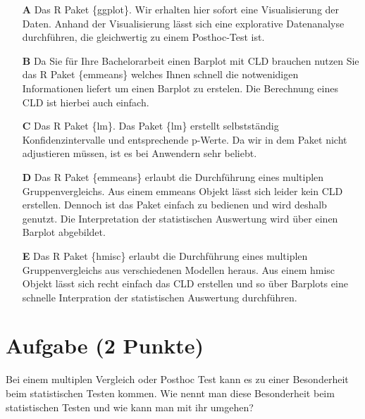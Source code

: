 \documentclass[a4paper, 9pt]{scrartcl}\usepackage[]{graphicx}\usepackage[]{xcolor}
\begin{document}
\begin{enumerate}
\item [\textbf{A} \msquare] Das R Paket \{ggplot\}. Wir erhalten hier sofort eine Visualisierung der Daten. Anhand der Visualisierung lässt sich eine explorative Datenanalyse durchführen, die gleichwertig zu einem Posthoc-Test ist.
\item [\textbf{B} \msquare] Da Sie für Ihre Bachelorarbeit einen Barplot mit CLD brauchen nutzen Sie das R Paket \{emmeans\} welches Ihnen schnell die notwenidigen Informationen liefert um einen Barplot zu erstelen. Die Berechnung eines CLD ist hierbei auch einfach.
\item [\textbf{C} \msquare] Das R Paket \{lm\}. Das Paket \{lm\} erstellt selbstständig Konfidenzintervalle und entsprechende p-Werte. Da wir in dem Paket nicht adjustieren müssen, ist es bei Anwendern sehr beliebt.
\item [\textbf{D} \msquare] Das R Paket \{emmeans\} erlaubt die Durchführung eines multiplen Gruppenvergleichs. Aus einem emmeans Objekt lässt sich leider kein CLD erstellen. Dennoch ist das Paket einfach zu bedienen und wird deshalb genutzt. Die Interpretation der statistischen Auswertung wird über einen Barplot abgebildet.
\item [\textbf{E} \msquare] Das R Paket \{hmisc\} erlaubt die Durchführung eines multiplen Gruppenvergleichs aus verschiedenen Modellen heraus. Aus einem hmisc Objekt lässt sich recht einfach das CLD erstellen und so über Barplots eine schnelle Interpration der statistischen Auswertung durchführen.
\end{enumerate}

\section{Aufgabe \hfill (2 Punkte)}



Bei einem multiplen Vergleich oder Posthoc Test kann es zu einer Besonderheit beim statistischen Testen kommen. Wie nennt man diese Besonderheit beim statistischen Testen und wie kann man mit ihr umgehen?
\end{document}
